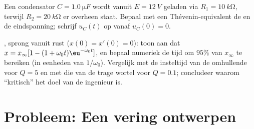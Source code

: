 \begin{exercise}[$\star\star\star$]\label{exo:b1:transient-regimes:11}
Een condensator $C = \qty{1.0}{\micro F}$ wordt vanuit $E = \qty{12}{V}$
geladen via $R_1 = \qty{10}{k\ohm}$, terwijl $R_2 = \qty{20}{k\ohm}$ er
overheen staat. Bepaal met een Thévenin-equivalent de  en de
eindspanning; schrijf $u_C(t)$ op vanaf $u_C(0) = 0$.
\end{exercise}

\begin{exercise}[$\star\star\star$]\label{exo:b1:transient-regimes:12}
, sprong vanuit rust ($x(0) = x'(0) = 0$): toon aan dat
$x = x_\infty[1 - (1 + \omega_0 t)\eu^{-\omega_0 t}]$, en bepaal
numeriek de tijd om $95\%$ van $x_\infty$ te bereiken (in eenheden van
$1/\omega_0$). Vergelijk met de insteltijd van de omhullende voor $Q = 5$
en met die van de trage wortel voor $Q = 0.1$; concludeer waarom ``kritisch'' het
doel van de ingenieur is.
\end{exercise}

\section{Probleem: Een vering ontwerpen}

